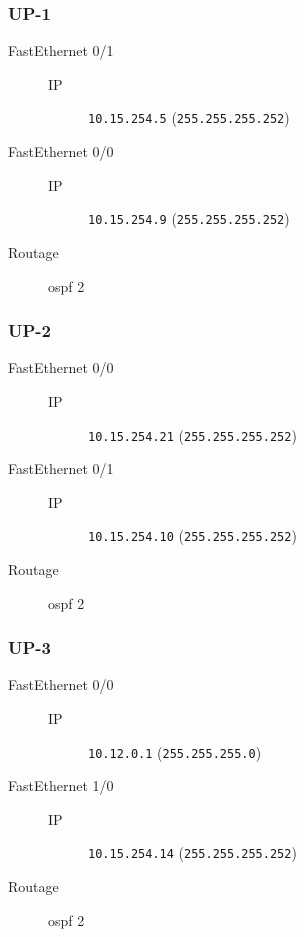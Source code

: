 \subsubsection{UP-1}

	\begin{description}
		\item[FastEthernet 0/1] 
		\begin{description}
			\item[IP] \texttt{10.15.254.5} (\texttt{255.255.255.252})
		\end{description}

		\item[FastEthernet 0/0] 
		\begin{description}
			\item[IP] \texttt{10.15.254.9} (\texttt{255.255.255.252})
		\end{description}

		\item[Routage] ospf 2
	\end{description}
\subsubsection{UP-2}

	\begin{description}
		\item[FastEthernet 0/0] 
		\begin{description}
			\item[IP] \texttt{10.15.254.21} (\texttt{255.255.255.252})
		\end{description}

		\item[FastEthernet 0/1] 
		\begin{description}
			\item[IP] \texttt{10.15.254.10} (\texttt{255.255.255.252})
		\end{description}

		\item[Routage] ospf 2
	\end{description}
\subsubsection{UP-3}

	\begin{description}
		\item[FastEthernet 0/0] 
		\begin{description}
			\item[IP] \texttt{10.12.0.1} (\texttt{255.255.255.0})
		\end{description}

		\item[FastEthernet 1/0] 
		\begin{description}
			\item[IP] \texttt{10.15.254.14} (\texttt{255.255.255.252})
		\end{description}

		\item[Routage] ospf 2
	\end{description}
